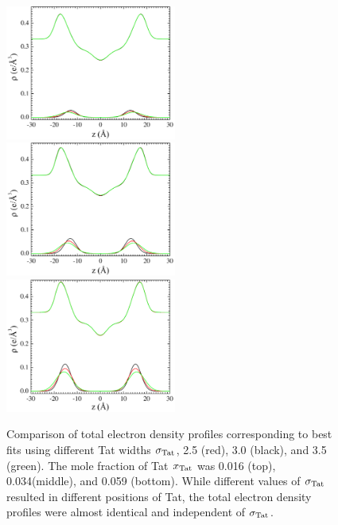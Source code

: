 \begin{figure}[htbp]
  \centering
  \includegraphics[width=0.5\textwidth]{figures/Tat/SDP_Results/EDP/DOPC_Tat_62to1_EDP}
  \includegraphics[width=0.5\textwidth]{figures/Tat/SDP_Results/EDP/DOPC_Tat_28to1_EDP}
  \includegraphics[width=0.5\textwidth]{figures/Tat/SDP_Results/EDP/DOPC_Tat_16to1_EDP}
  \caption[]{Comparison of total electron density profiles corresponding to best fits using 
  different Tat widths $\sigma_\textrm{Tat}$, 2.5 (red), 3.0 (black), and 3.5 (green). 
  The mole fraction of Tat $x_\textrm{Tat}$
  was 0.016 (top), 0.034(middle), and 0.059 (bottom). While different values of 
  $\sigma_\textrm{Tat}$ resulted in different positions of Tat, the total electron density
  profiles were almost identical and independent of $\sigma_\textrm{Tat}$.}
  \label{fig:DOPC_Tat_EDP}
\end{figure}

